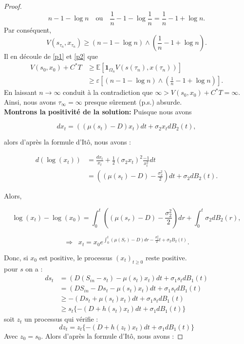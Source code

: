 \documentclass[12pt,a4paper]{report}%
\begin{document}
\begin{proof}
	\[
	n - 1 - \log n \quad \text{ou} \quad \frac{1}{n} - 1 - \log \frac{1}{n} = \frac{1}{n} - 1 + \log n.
	\]
	Par conséquent,
	\[
	V(s_{\tau_n}, x_{\tau_n}) \geqslant (n - 1 - \log n) \wedge \left(\frac{1}{n} - 1 + \log n\right).
	\]
	Il en découle de \eqref{p1} et \eqref{p2} que
	$$
	\begin{aligned}
		V(s_0, x_0) + C^* T &\geqslant \mathbb{E}\left[\mathbf{1}_{\Omega_n} V(s(\tau_n), x(\tau_n))\right]\\
		&\geqslant \varepsilon \left[(n - 1 - \log n) \wedge \left(\frac{1}{n} - 1 + \log n\right)\right].
	\end{aligned}
	$$
	En laissant \(n \to \infty\) conduit à la contradiction que \(\infty > V(s_0, x_0) + C^* T = \infty\). Ainsi, nous avons \(\tau_\infty = \infty\) presque sûrement (p.s.) absurde.\\
	
	{\bf Montrons la positivité de la solution:} Puisque nous avons
	
	\[
	dx_t = \left((\mu(s_t) - D)x_t\right) dt + \sigma_2 x_t dB_2(t),
	\]
	
	alors d'après la formule d'Itô, nous avons :
	
	\[
	\begin{aligned}
		d(\log(x_t)) &= \frac{dx_t}{x_t} + \frac{1}{2}(\sigma_2 x_t)^2 \frac{-1}{x_t^2} dt \\
		&= \left((\mu(s_t) - D) - \frac{\sigma_2^2}{2}\right) dt + \sigma_2 dB_2(t).
	\end{aligned}
	\]
	
	Alors,
	
	\[
	\log(x_t) - \log(x_0) = \int_0^t \left((\mu(s_r) - D) - \frac{\sigma_2^2}{2}\right) dr + \int_0^t \sigma_2 dB_2(r),
	\]
	
	\[
	\Rightarrow \;\; x_t = x_0 e^{\int_0^t (\mu(S_r) - D) dr - \frac{\sigma_2^2}{2} t + \sigma_2 B_2(t)}.
	\]
	
	Donc, si \(x_0\) est positive, le processus \((x_t)_{t\geqslant0 }\) reste positive.\\
	pour $s$ on a :
	\[
	\begin{aligned}
		ds_t &= \left( D \left(S_{in}-s_t\right) - \mu(s_t)x_t\right) dt + \sigma_1 s_t dB_1(t)\\
		&=\left( D S_{in}-D s_t - \mu(s_t)x_t\right) dt + \sigma_1 s_t dB_1(t)\\
		&\geqslant - \left( D s_t + \mu(s_t)x_t\right) dt + \sigma_1 s_t dB_1(t)\\
		&\geqslant s_t\lbrace -( D + h(s_t)x_t) dt + \sigma_1 dB_1(t)\rbrace
	\end{aligned}
	\]
	soit $z_t$ un processus qui vérifie :
	$$
	dz_t=z_t\lbrace -( D + h(z_t)x_t) dt + \sigma_1 dB_1(t)\rbrace
	$$
	Avec $z_0=s_0$. Alors d'après la formule d'Itô, nous avons :
	

\end{proof}
\end{document}
